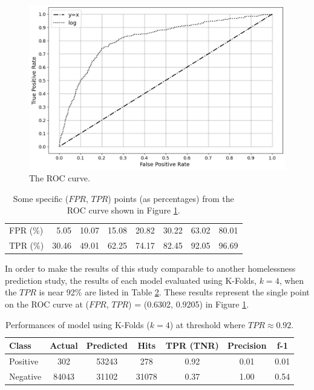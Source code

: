 \documentclass[12pt]{report}
\begin{document}
\begin{figure}[h]
    \centering
    \includegraphics[width=\textwidth]{../img/ROC.png}
    \caption[ROC curve]{The ROC curve.}
    \label{fig:ROC}
\end{figure}

\begin{table}[h]
    \centering
    \begin{tabular}{lrrrrrrr}
        \toprule
        FPR (\%) &  5.05 & 10.07 & 15.08 & 20.82 & 30.22 & 63.02 & 80.01 \\
        TPR (\%) & 30.46 & 49.01 & 62.25 & 74.17 & 82.45 & 92.05 & 96.69 \\
        \bottomrule
    \end{tabular}
    \caption{Some specific ($FPR$, $TPR$) points (as percentages) from the ROC curve shown in Figure \ref{fig:ROC}.}
    \label{tbl:ROCpoints}
\end{table}

In order to make the results of this study comparable to another homelessness prediction study, the results of each model evaluated using K-Folds, $k=4$, when the $TPR$ is near 92\% are listed in Table \ref{tbl:perfAtRec092}. These results represent the single point on the ROC curve at ($FPR$, $TPR$) = (0.6302, 0.9205) in Figure \ref{fig:ROC}. 

\begin{table}
    \centering
    \begin{tabular}{lcccccc}
        \toprule
        Class & Actual & Predicted &  Hits &  TPR (TNR) &  Precision &  f-1 \\
        \midrule
        Positive &    302 &     53243 &   278 &       0.92 &       0.01 & 0.01 \\
        Negative &  84043 &     31102 & 31078 &       0.37 &       1.00 & 0.54 \\
        \bottomrule
    \end{tabular}
    \caption[Performance of model when recall is 0.92]{Performances of model using K-Folds ($k=4$) at threshold where $TPR \approx 0.92$.}
    \label{tbl:perfAtRec092}
\end{table}
\end{document}
